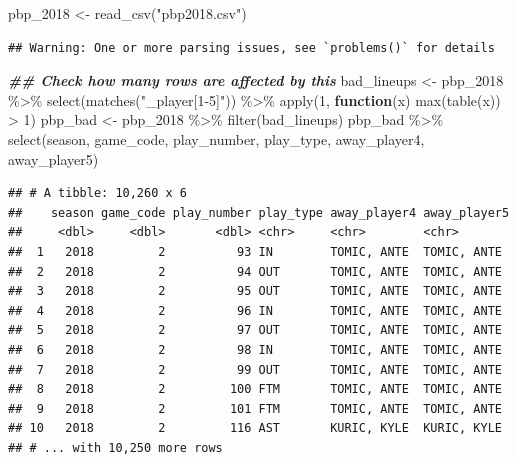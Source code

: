 \documentclass[
]{article}
\newenvironment{Shaded}{\begin{snugshade}}{\end{snugshade}}
\newcommand{\ControlFlowTok}[1]{\textcolor[rgb]{0.13,0.29,0.53}{\textbf{#1}}}
\newcommand{\DecValTok}[1]{\textcolor[rgb]{0.00,0.00,0.81}{#1}}
\newcommand{\DocumentationTok}[1]{\textcolor[rgb]{0.56,0.35,0.01}{\textbf{\textit{#1}}}}
\newcommand{\FunctionTok}[1]{\textcolor[rgb]{0.00,0.00,0.00}{#1}}
\newcommand{\NormalTok}[1]{#1}
\newcommand{\OtherTok}[1]{\textcolor[rgb]{0.56,0.35,0.01}{#1}}
\newcommand{\SpecialCharTok}[1]{\textcolor[rgb]{0.00,0.00,0.00}{#1}}
\newcommand{\StringTok}[1]{\textcolor[rgb]{0.31,0.60,0.02}{#1}}
\begin{document}
\begin{Shaded}
\begin{Highlighting}[]
\NormalTok{pbp\_2018 }\OtherTok{\textless{}{-}} \FunctionTok{read\_csv}\NormalTok{(}\StringTok{"pbp2018.csv"}\NormalTok{)}
\end{Highlighting}
\end{Shaded}

\begin{verbatim}
## Warning: One or more parsing issues, see `problems()` for details
\end{verbatim}

\begin{Shaded}
\begin{Highlighting}[]
\DocumentationTok{\#\# Check how many rows are affected by this}
\NormalTok{bad\_lineups }\OtherTok{\textless{}{-}}\NormalTok{ pbp\_2018 }\SpecialCharTok{\%\textgreater{}\%}
  \FunctionTok{select}\NormalTok{(}\FunctionTok{matches}\NormalTok{(}\StringTok{"\_player[1{-}5]"}\NormalTok{)) }\SpecialCharTok{\%\textgreater{}\%}
  \FunctionTok{apply}\NormalTok{(}\DecValTok{1}\NormalTok{, }\ControlFlowTok{function}\NormalTok{(x) }\FunctionTok{max}\NormalTok{(}\FunctionTok{table}\NormalTok{(x)) }\SpecialCharTok{\textgreater{}} \DecValTok{1}\NormalTok{)}
\NormalTok{pbp\_bad }\OtherTok{\textless{}{-}}\NormalTok{ pbp\_2018 }\SpecialCharTok{\%\textgreater{}\%}
  \FunctionTok{filter}\NormalTok{(bad\_lineups)}
\NormalTok{pbp\_bad }\SpecialCharTok{\%\textgreater{}\%}
  \FunctionTok{select}\NormalTok{(season, game\_code, play\_number, play\_type, away\_player4, away\_player5)}
\end{Highlighting}
\end{Shaded}

\begin{verbatim}
## # A tibble: 10,260 x 6
##    season game_code play_number play_type away_player4 away_player5
##     <dbl>     <dbl>       <dbl> <chr>     <chr>        <chr>       
##  1   2018         2          93 IN        TOMIC, ANTE  TOMIC, ANTE 
##  2   2018         2          94 OUT       TOMIC, ANTE  TOMIC, ANTE 
##  3   2018         2          95 OUT       TOMIC, ANTE  TOMIC, ANTE 
##  4   2018         2          96 IN        TOMIC, ANTE  TOMIC, ANTE 
##  5   2018         2          97 OUT       TOMIC, ANTE  TOMIC, ANTE 
##  6   2018         2          98 IN        TOMIC, ANTE  TOMIC, ANTE 
##  7   2018         2          99 OUT       TOMIC, ANTE  TOMIC, ANTE 
##  8   2018         2         100 FTM       TOMIC, ANTE  TOMIC, ANTE 
##  9   2018         2         101 FTM       TOMIC, ANTE  TOMIC, ANTE 
## 10   2018         2         116 AST       KURIC, KYLE  KURIC, KYLE 
## # ... with 10,250 more rows
\end{verbatim}
\end{document}

